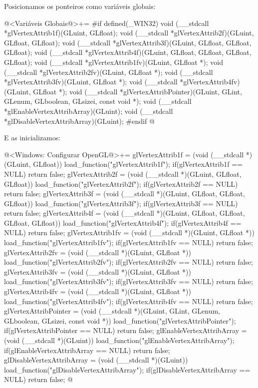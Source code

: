 Posicionamos os ponteiros como variáveis globais:

\iniciocodigo
@<Variáveis Globais@>+=
#if defined(_WIN32)
void (__stdcall *glVertexAttrib1f)(GLuint, GLfloat);
void (__stdcall *glVertexAttrib2f)(GLuint, GLfloat, GLfloat);
void (__stdcall *glVertexAttrib3f)(GLuint, GLfloat, GLfloat, GLfloat);
void (__stdcall *glVertexAttrib4f)(GLuint, GLfloat, GLfloat, GLfloat, GLfloat);
void (__stdcall *glVertexAttrib1fv)(GLuint, GLfloat *);
void (__stdcall *glVertexAttrib2fv)(GLuint, GLfloat *);
void (__stdcall *glVertexAttrib3fv)(GLuint, GLfloat *);
void (__stdcall *glVertexAttrib4fv)(GLuint, GLfloat *);
void (__stdcall *glVertexAttribPointer)(GLuint, GLint, GLenum, GLboolean,
                                        GLsizei, const void *);
void (__stdcall *glEnableVertexAttribArray)(GLuint);
void (__stdcall *glDisableVertexAttribArray)(GLuint);
#endif
@
\fimcodigo

E as inicializamos:

\iniciocodigo
@<Windows: Configurar OpenGL@>+=
glVertexAttrib1f = (void (__stdcall *)(GLuint, GLfloat))
                     load_function("glVertexAttrib1f");
if(glVertexAttrib1f == NULL) return false;
glVertexAttrib2f = (void (__stdcall *)(GLuint, GLfloat, GLfloat))
                      load_function("glVertexAttrib2f");
if(glVertexAttrib2f == NULL) return false;
glVertexAttrib3f = (void (__stdcall *)(GLuint, GLfloat, GLfloat, GLfloat))
                      load_function("glVertexAttrib3f");
if(glVertexAttrib3f == NULL) return false;
glVertexAttrib4f = (void (__stdcall *)(GLuint, GLfloat, GLfloat, GLfloat,
                                       GLfloat))
                      load_function("glVertexAttrib4f");
if(glVertexAttrib4f == NULL) return false;
glVertexAttrib1fv = (void (__stdcall *)(GLuint, GLfloat *))
                       load_function("glVertexAttrib1fv");
if(glVertexAttrib1fv == NULL) return false;
glVertexAttrib2fv = (void (__stdcall *)(GLuint, GLfloat *))
                       load_function("glVertexAttrib2fv");
if(glVertexAttrib2fv == NULL) return false;
glVertexAttrib3fv = (void (__stdcall *)(GLuint, GLfloat *))
                       load_function("glVertexAttrib3fv");
if(glVertexAttrib3fv == NULL) return false;
glVertexAttrib4fv = (void (__stdcall *)(GLuint, GLfloat *))
                       load_function("glVertexAttrib4fv");
if(glVertexAttrib4fv == NULL) return false;
glVertexAttribPointer = (void (__stdcall *)(GLuint, GLint, GLenum, GLboolean,
                         GLsizei, const void *))
                              load_function("glVertexAttribPointer");
if(glVertexAttribPointer == NULL) return false;
glEnableVertexAttribArray = (void (__stdcall *)(GLuint))
                              load_function("glEnableVertexAttribArray");
if(glEnableVertexAttribArray == NULL) return false;
glDisableVertexAttribArray = (void (__stdcall *)(GLuint))
                               load_function("glDisableVertexAttribArray");
if(glDisableVertexAttribArray == NULL) return false;
@
\fimcodigo

